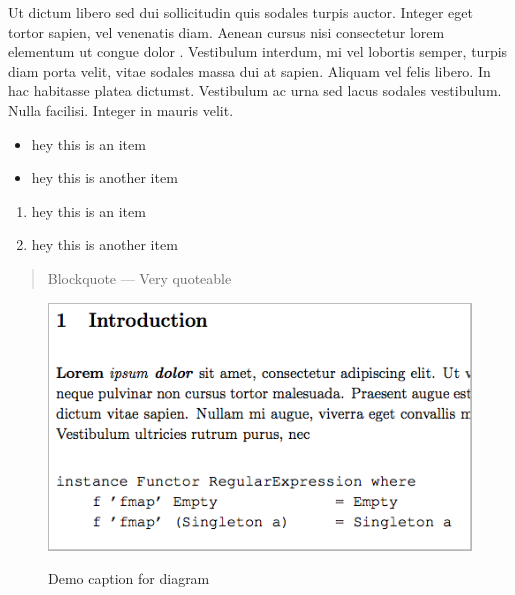 Ut dictum libero sed dui sollicitudin quis sodales turpis auctor.
Integer eget tortor sapien, vel venenatis diam. Aenean cursus nisi
consectetur lorem elementum ut congue dolor . Vestibulum interdum, mi
vel lobortis semper, turpis diam porta velit, vitae sodales massa dui at
sapien. Aliquam vel felis libero. In hac habitasse platea dictumst.
Vestibulum ac urna sed lacus sodales vestibulum. Nulla facilisi. Integer
in mauris velit.

\begin{itemize}
\item
  hey this is an item
\item
  hey this is another item
\end{itemize}
\begin{enumerate}
\item
  hey this is an item
\item
  hey this is another item
\end{enumerate}
\begin{quote}
Blockquote --- Very quoteable

\end{quote}
\begin{figure}[H]
  \centering
    \includegraphics[scale=0.6]{screenshot.png}
  \label{fig:component-http}
  \caption{Demo caption for diagram}
\end{figure}
